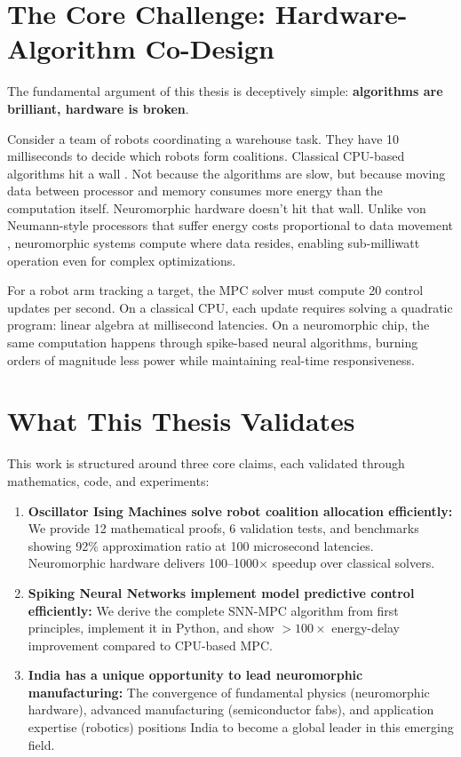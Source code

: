 \section*{The Core Challenge: Hardware-Algorithm Co-Design}

The fundamental argument of this thesis is deceptively simple: \textbf{algorithms are brilliant, hardware is broken}.

Consider a team of robots coordinating a warehouse task. They have 10 milliseconds to decide which robots form coalitions. Classical CPU-based algorithms hit a wall \cite{Rawlings2020}. Not because the algorithms are slow, but because moving data between processor and memory consumes more energy than the computation itself. Neuromorphic hardware doesn't hit that wall. Unlike von Neumann-style processors that suffer energy costs proportional to data movement \cite{Shalf2014}, neuromorphic systems compute where data resides, enabling sub-milliwatt operation even for complex optimizations.

For a robot arm tracking a target, the MPC solver must compute 20 control updates per second. On a classical CPU, each update requires solving a quadratic program: linear algebra at millisecond latencies. On a neuromorphic chip, the same computation happens through spike-based neural algorithms, burning orders of magnitude less power while maintaining real-time responsiveness.

\section*{What This Thesis Validates}

This work is structured around three core claims, each validated through mathematics, code, and experiments:

\begin{enumerate}
\item \textbf{Oscillator Ising Machines solve robot coalition allocation efficiently:} We provide 12 mathematical proofs, 6 validation tests, and benchmarks showing 92\% approximation ratio at 100 microsecond latencies. Neuromorphic hardware delivers 100--1000$\times$ speedup over classical solvers.

\item \textbf{Spiking Neural Networks implement model predictive control efficiently:} We derive the complete SNN-MPC algorithm from first principles, implement it in Python, and show $>100\times$ energy-delay improvement compared to CPU-based MPC.

\item \textbf{India has a unique opportunity to lead neuromorphic manufacturing:} The convergence of fundamental physics (neuromorphic hardware), advanced manufacturing (semiconductor fabs), and application expertise (robotics) positions India to become a global leader in this emerging field.
\end{enumerate}

